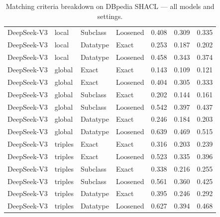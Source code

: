 \begin{table}[h]
\begin{tabular}{ll|ll|ccc}
DeepSeek-V3 & local & Subclass & Loosened & 0.408 & 0.309 & 0.335 \\
DeepSeek-V3 & local & Datatype & Exact & 0.253 & 0.187 & 0.202 \\
DeepSeek-V3 & local & Datatype & Loosened & 0.458 & 0.343 & 0.374 \\
DeepSeek-V3 & global & Exact & Exact & 0.143 & 0.109 & 0.121 \\
DeepSeek-V3 & global & Exact & Loosened & 0.404 & 0.305 & 0.333 \\
DeepSeek-V3 & global & Subclass & Exact & 0.202 & 0.144 & 0.161 \\
DeepSeek-V3 & global & Subclass & Loosened & 0.542 & 0.397 & 0.437 \\
DeepSeek-V3 & global & Datatype & Exact & 0.246 & 0.184 & 0.203 \\
DeepSeek-V3 & global & Datatype & Loosened & 0.639 & 0.469 & 0.515 \\
DeepSeek-V3 & triples & Exact & Exact & 0.316 & 0.203 & 0.239 \\
DeepSeek-V3 & triples & Exact & Loosened & 0.523 & 0.335 & 0.396 \\
DeepSeek-V3 & triples & Subclass & Exact & 0.338 & 0.216 & 0.255 \\
DeepSeek-V3 & triples & Subclass & Loosened & 0.561 & 0.360 & 0.425 \\
DeepSeek-V3 & triples & Datatype & Exact & 0.395 & 0.246 & 0.292 \\
DeepSeek-V3 & triples & Datatype & Loosened & 0.627 & 0.394 & 0.468 \\
\hline
\end{tabular}
\caption{Matching criteria breakdown on DBpedia SHACL — all models and settings.}
\label{tab:t4-all-dbpedia-criteria-shacl}
\end{table}
